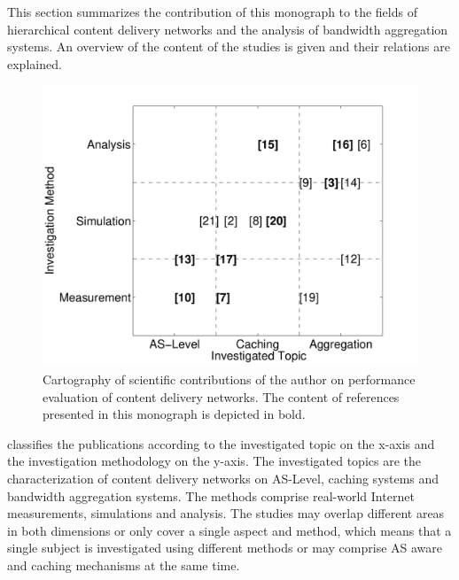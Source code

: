 This section summarizes the contribution of this monograph to the fields of hierarchical content delivery networks and the analysis of bandwidth aggregation systems.
An overview of the content of the studies is given and their relations are explained.

\begin{figure}
\centering
\includegraphics[width=\textwidth]{figures/publications}
\caption{Cartography of scientific contributions of the author on performance evaluation of content delivery networks. The content of references presented in this monograph is depicted in bold.}\label{fig:introduction:publications}
\end{figure}

 classifies the publications according to the investigated topic on the x-axis and the investigation methodology on the y-axis.
The investigated topics are the characterization of content delivery networks on AS-Level, caching systems and bandwidth aggregation systems.
The methods comprise real-world Internet measurements, simulations and analysis.
The studies may overlap different areas in both dimensions or only cover a single aspect and method, which means that a single subject is investigated using different methods or may comprise AS aware and caching mechanisms at the same time.


